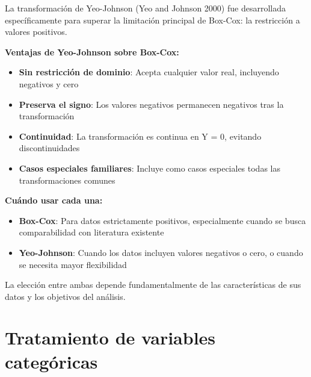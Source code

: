 \documentclass[
  letterpaper,
  DIV=11,
  numbers=noendperiod]{scrreprt}
\providecommand{\tightlist}{%
  \setlength{\itemsep}{0pt}\setlength{\parskip}{0pt}}
\begin{document}
\begin{tcolorbox}[enhanced jigsaw, leftrule=.75mm, breakable, colbacktitle=quarto-callout-note-color!10!white, bottomrule=.15mm, colframe=quarto-callout-note-color-frame, toprule=.15mm, colback=white, coltitle=black, bottomtitle=1mm, left=2mm, title=\textcolor{quarto-callout-note-color}{\faInfo}\hspace{0.5em}{Extensión: Transformación de Yeo-Johnson}, opacityback=0, arc=.35mm, opacitybacktitle=0.6, toptitle=1mm, titlerule=0mm, rightrule=.15mm]

La transformación de Yeo-Johnson (Yeo and Johnson 2000) fue desarrollada
específicamente para superar la limitación principal de Box-Cox: la
restricción a valores positivos.

\textbf{Ventajas de Yeo-Johnson sobre Box-Cox:}

\begin{itemize}
\tightlist
\item
  \textbf{Sin restricción de dominio}: Acepta cualquier valor real,
  incluyendo negativos y cero
\item
  \textbf{Preserva el signo}: Los valores negativos permanecen negativos
  tras la transformación
\item
  \textbf{Continuidad}: La transformación es continua en Y = 0, evitando
  discontinuidades
\item
  \textbf{Casos especiales familiares}: Incluye como casos especiales
  todas las transformaciones comunes
\end{itemize}

\textbf{Cuándo usar cada una:}

\begin{itemize}
\tightlist
\item
  \textbf{Box-Cox}: Para datos estrictamente positivos, especialmente
  cuando se busca comparabilidad con literatura existente
\item
  \textbf{Yeo-Johnson}: Cuando los datos incluyen valores negativos o
  cero, o cuando se necesita mayor flexibilidad
\end{itemize}

La elección entre ambas depende fundamentalmente de las características
de sus datos y los objetivos del análisis.

\end{tcolorbox}

\section{Tratamiento de variables
categóricas}\label{tratamiento-de-variables-categuxf3ricas}
\end{document}
